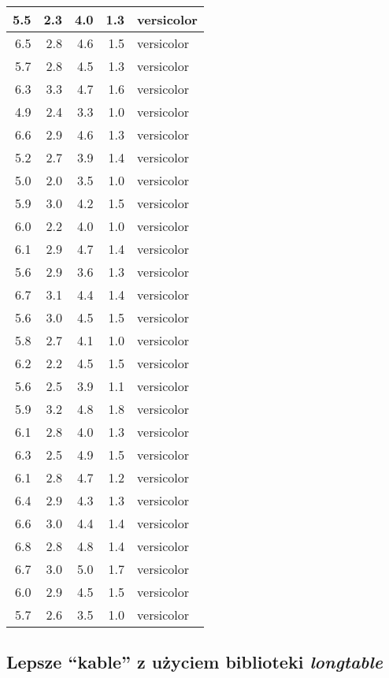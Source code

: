 \documentclass[a4paper, 10pt]{article}\usepackage[]{graphicx}\usepackage[]{color}
\begin{document}
\begin{tabular}{r|r|r|r|l}
\hline
5.5 & 2.3 & 4.0 & 1.3 & versicolor\\
\hline
6.5 & 2.8 & 4.6 & 1.5 & versicolor\\
\hline
5.7 & 2.8 & 4.5 & 1.3 & versicolor\\
\hline
6.3 & 3.3 & 4.7 & 1.6 & versicolor\\
\hline
4.9 & 2.4 & 3.3 & 1.0 & versicolor\\
\hline
6.6 & 2.9 & 4.6 & 1.3 & versicolor\\
\hline
5.2 & 2.7 & 3.9 & 1.4 & versicolor\\
\hline
5.0 & 2.0 & 3.5 & 1.0 & versicolor\\
\hline
5.9 & 3.0 & 4.2 & 1.5 & versicolor\\
\hline
6.0 & 2.2 & 4.0 & 1.0 & versicolor\\
\hline
6.1 & 2.9 & 4.7 & 1.4 & versicolor\\
\hline
5.6 & 2.9 & 3.6 & 1.3 & versicolor\\
\hline
6.7 & 3.1 & 4.4 & 1.4 & versicolor\\
\hline
5.6 & 3.0 & 4.5 & 1.5 & versicolor\\
\hline
5.8 & 2.7 & 4.1 & 1.0 & versicolor\\
\hline
6.2 & 2.2 & 4.5 & 1.5 & versicolor\\
\hline
5.6 & 2.5 & 3.9 & 1.1 & versicolor\\
\hline
5.9 & 3.2 & 4.8 & 1.8 & versicolor\\
\hline
6.1 & 2.8 & 4.0 & 1.3 & versicolor\\
\hline
6.3 & 2.5 & 4.9 & 1.5 & versicolor\\
\hline
6.1 & 2.8 & 4.7 & 1.2 & versicolor\\
\hline
6.4 & 2.9 & 4.3 & 1.3 & versicolor\\
\hline
6.6 & 3.0 & 4.4 & 1.4 & versicolor\\
\hline
6.8 & 2.8 & 4.8 & 1.4 & versicolor\\
\hline
6.7 & 3.0 & 5.0 & 1.7 & versicolor\\
\hline
6.0 & 2.9 & 4.5 & 1.5 & versicolor\\
\hline
5.7 & 2.6 & 3.5 & 1.0 & versicolor\\
\hline
\end{tabular}


\subsection{Lepsze ``kable'' z użyciem biblioteki \emph{longtable}}
\end{document}
